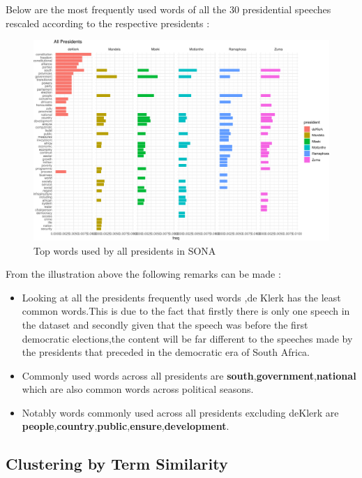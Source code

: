 \documentclass[]{article}
\begin{document}
Below are the most frequently used words of all the 30 presidential
speeches rescaled according to the respective presidents :

\begin{figure}[H]

{\centering \includegraphics{datasci_fi_Assignment_2_files/figure-latex/eda_presi -1} 

}

\caption{Top words used by all presidents in SONA}\label{fig:eda_presi }
\end{figure}

From the illustration above the following remarks can be made :

\begin{itemize}
\item Looking at all the presidents frequently used words ,de Klerk has the least common words.This is due to the fact that firstly there is only one speech in the dataset and secondly given that the speech was before the first democratic elections,the content will be far different to the  speeches made by the presidents that preceded in the democratic era of South Africa.
\item Commonly used words across all presidents are \textbf{south},\textbf{government},\textbf{national} which are also common words across political seasons.
\item Notably words commonly used across all presidents excluding deKlerk are \textbf{people},\textbf{country},\textbf{public},\textbf{ensure},\textbf{development}.
\end{itemize}

\subsection{Clustering by Term Similarity}
\end{document}
